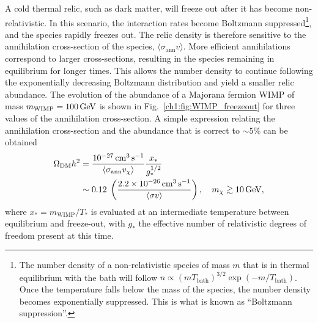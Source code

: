 A cold thermal relic, such as dark matter, will freeze out after it has become non-relativistic. In this scenario, the interaction rates become Boltzmann suppressed\footnote{The number density of a non-relativistic species of mass $m$ that is in thermal equilibrium with the bath will follow $n \propto \left(m T_\mathrm{bath}\right)^{3/2} \exp\left(-m /T_\mathrm{bath}\right)$. Once the temperature falls below the mass of the species, the number density becomes exponentially suppressed. This is what is known as ``Boltzmann suppression''.}, and the species rapidly freezes out. The relic density is therefore sensitive to the annihilation cross-section of the species, $\langle \sigma_\mathrm{ann} v\rangle$. More efficient annihilations correspond to larger cross-sections, resulting in the species remaining in equilibrium for longer times. This allows the number density to continue following the exponentially decreasing Boltzmann distribution and yield a smaller relic abundance. The evolution of the abundance of a Majorana fermion WIMP of mass $m_\mathrm{WIMP} = 100{\rm \,GeV}$ is shown in Fig.~\ref{ch1:fig:WIMP_freezeout} for three values of the annihilation cross-section. A simple expression  relating the annihilation cross-section and the abundance that is correct to $\sim5\%$ can be obtained~\cite{Steigman:2012nb_PreciseRelicWIMP} 
\begin{align}
    \Omega_{\mathrm{DM}}h^2 & = \frac{10^{-27}{\rm \,cm}^3{\rm \,s}^{-1}}{\langle \sigma_{\rm ann} v_\chi \rangle} \frac{x_*}{g_*^{1/2}}\\
     &\sim 0.12 \; \left(\frac{2.2\times 10^{-26}{\rm \,cm}^3 {\rm \,s}^{-1}}{\langle \sigma v\rangle}\right),\quad m_\chi\gtrsim 10{\rm \,GeV},
\end{align}
where $x_* = m_\mathrm{WIMP}/T_*$ is evaluated at an intermediate temperature between equilibrium and freeze-out, with $g_*$ the effective number of relativistic degrees of freedom present at this time. 

